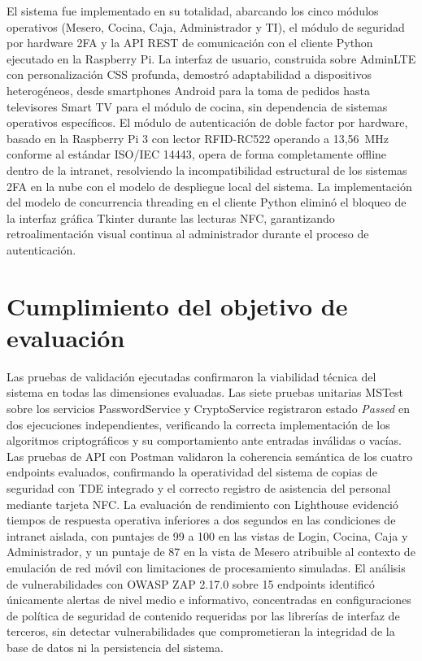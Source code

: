 El sistema fue implementado en su totalidad, abarcando los cinco módulos operativos
(Mesero, Cocina, Caja, Administrador y TI), el módulo de seguridad por hardware 2FA
y la API REST de comunicación con el cliente Python ejecutado en la Raspberry Pi. La
interfaz de usuario, construida sobre AdminLTE con personalización CSS profunda,
demostró adaptabilidad a dispositivos heterogéneos, desde smartphones Android para
la toma de pedidos hasta televisores Smart TV para el módulo de cocina, sin dependencia
de sistemas operativos específicos. El módulo de autenticación de doble factor por
hardware, basado en la Raspberry Pi 3 con lector RFID-RC522 operando a 13,56~MHz
conforme al estándar ISO/IEC 14443, opera de forma completamente offline dentro de la
intranet, resolviendo la incompatibilidad estructural de los sistemas 2FA en la nube
con el modelo de despliegue local del sistema. La implementación del modelo de
concurrencia threading en el cliente Python eliminó el bloqueo de la interfaz gráfica
Tkinter durante las lecturas NFC, garantizando retroalimentación visual continua al
administrador durante el proceso de autenticación.

\section*{Cumplimiento del objetivo de evaluación}

Las pruebas de validación ejecutadas confirmaron la viabilidad técnica del sistema
en todas las dimensiones evaluadas. Las siete pruebas unitarias MSTest sobre los
servicios PasswordService y CryptoService registraron estado \textit{Passed} en dos
ejecuciones independientes, verificando la correcta implementación de los algoritmos
criptográficos y su comportamiento ante entradas inválidas o vacías. Las pruebas de
API con Postman validaron la coherencia semántica de los cuatro endpoints evaluados,
confirmando la operatividad del sistema de copias de seguridad con TDE integrado y el
correcto registro de asistencia del personal mediante tarjeta NFC. La evaluación de
rendimiento con Lighthouse evidenció tiempos de respuesta operativa inferiores a dos
segundos en las condiciones de intranet aislada, con puntajes de 99 a 100 en las vistas
de Login, Cocina, Caja y Administrador, y un puntaje de 87 en la vista de Mesero
atribuible al contexto de emulación de red móvil con limitaciones de procesamiento
simuladas. El análisis de vulnerabilidades con OWASP ZAP 2.17.0 sobre 15 endpoints
identificó únicamente alertas de nivel medio e informativo, concentradas en
configuraciones de política de seguridad de contenido requeridas por las librerías de
interfaz de terceros, sin detectar vulnerabilidades que comprometieran la integridad
de la base de datos ni la persistencia del sistema.

